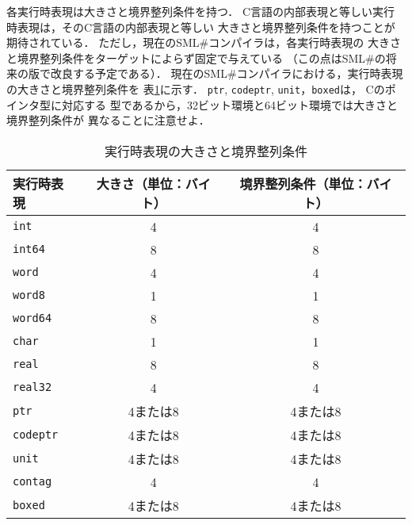 \documentclass{jbook}
\newcommand{\smlsharp}{SML\#}
\begin{document}
	各実行時表現は大きさと境界整列条件を持つ．
	C言語の内部表現と等しい実行時表現は，そのC言語の内部表現と等しい
大きさと境界整列条件を持つことが期待されている．
	ただし，現在の\smlsharp{}コンパイラは，各実行時表現の
大きさと境界整列条件をターゲットによらず固定で与えている
（この点は\smlsharp{}の将来の版で改良する予定である）．
	現在の\smlsharp{}コンパイラにおける，実行時表現の大きさと境界整列条件を
表\ref{tab:runtimesize}に示す．
	{\tt ptr}, {\tt codeptr}, {\tt unit}，{\tt boxed}は，
Cのポインタ型に対応する
型であるから，32ビット環境と64ビット環境では大きさと境界整列条件が
異なることに注意せよ．
\begin{table}
\begin{center}
\begin{tabular}{|l|c|c|}
\hline
実行時表現 & 大きさ（単位：バイト） & 境界整列条件（単位：バイト）\\ \hline
{\tt int} & 4 & 4 \\
{\tt int64} & 8 & 8 \\
{\tt word} & 4 & 4 \\
{\tt word8} & 1 & 1 \\
{\tt word64} & 8 & 8 \\
{\tt char} & 1 & 1 \\
{\tt real} & 8 & 8 \\
{\tt real32} & 4 & 4 \\
{\tt ptr} & 4または8 & 4または8 \\
{\tt codeptr} & 4または8 & 4または8 \\
{\tt unit} & 4または8 & 4または8 \\
{\tt contag} & 4 & 4 \\
{\tt boxed} & 4または8 & 4または8 \\
\hline
\end{tabular}
\end{center}
\caption{実行時表現の大きさと境界整列条件}
\label{tab:runtimesize}
\end{table}
\end{document}
